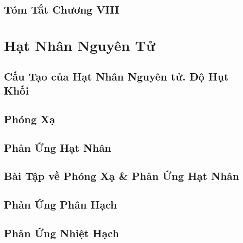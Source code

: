\documentclass{article}
\numberwithin{equation}{section}
\begin{document}

\subsection{Tóm Tắt Chương VIII}


\section{Hạt Nhân Nguyên Tử}

\subsection{Cấu Tạo của Hạt Nhân Nguyên tử. Độ Hụt Khối}


\subsection{Phóng Xạ}


\subsection{Phản Ứng Hạt Nhân}


\subsection{Bài Tập về Phóng Xạ \& Phản Ứng Hạt Nhân}


\subsection{Phản Ứng Phân Hạch}


\subsection{Phản Ứng Nhiệt Hạch}
\end{document}
